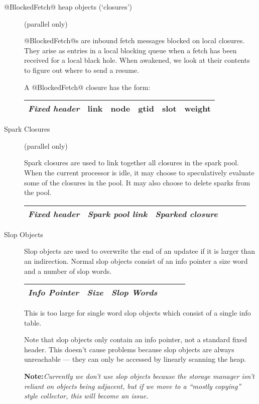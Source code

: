 \documentclass[11pt]{article}
\newcommand{\note}[1]{{{\bf Note:}\sl #1}}
\begin{document}
\begin{description}
\item[@BlockedFetch@ heap objects (`closures')] (parallel only)

@BlockedFetch@s are inbound fetch messages blocked on local closures.
They arise as entries in a local blocking queue when a fetch has been
received for a local black hole.  When awakened, we look at their
contents to figure out where to send a resume.

A @BlockedFetch@ closure has the form:
\begin{center}
\begin{tabular}{|l|l|l|l|l|l|}\hline
\emph{Fixed header} & link & node & gtid & slot & weight \\ \hline
\end{tabular}
\end{center}

\item[Spark Closures] (parallel only)

Spark closures are used to link together all closures in the spark pool.  When
the current processor is idle, it may choose to speculatively evaluate some of
the closures in the pool.  It may also choose to delete sparks from the pool.
\begin{center}
\begin{tabular}{|l|l|l|l|l|l|}\hline
\emph{Fixed header} & \emph{Spark pool link} & \emph{Sparked closure} \\ \hline
\end{tabular}
\end{center}

\item[Slop Objects]\label{sec:slop-objects}

Slop objects are used to overwrite the end of an updatee if it is
larger than an indirection.  Normal slop objects consist of an info
pointer a size word and a number of slop words.  

\begin{center}
\begin{tabular}{|l|l|l|l|l|l|}\hline
\emph{Info Pointer} & \emph{Size} & \emph{Slop Words} \\ \hline
\end{tabular}
\end{center}

This is too large for single word slop objects which consist of a
single info table.

Note that slop objects only contain an info pointer, not a standard
fixed header.  This doesn't cause problems because slop objects are
always unreachable --- they can only be accessed by linearly scanning
the heap.

\note{Currently we don't use slop objects because the storage manager
isn't reliant on objects being adjacent, but if we move to a ``mostly
copying'' style collector, this will become an issue.}

\end{description}
\end{document}
